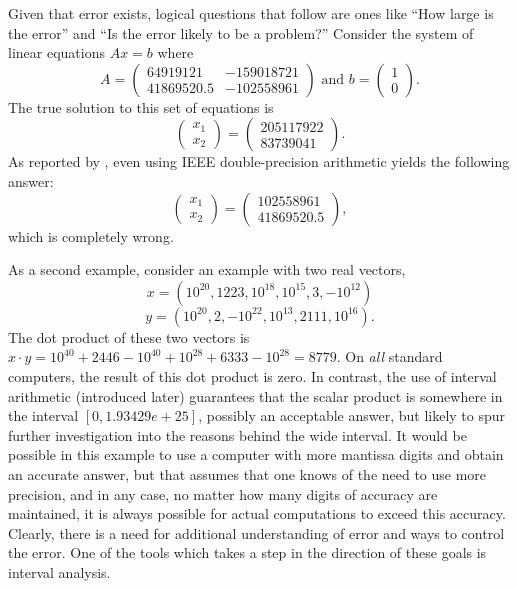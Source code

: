 Given that error exists, logical questions that follow are ones like ``How
large is the error'' and ``Is the error likely to be a problem?''
Consider the system of linear equations $Ax=b$ where
\begin{equation}
 A = \left( \begin{array}{ll}
  64919121 & -159018721 \\
  41869520.5 & -102558961
 \end{array}\right)
 \mbox{ and } b = \left( \begin{array}{l}1 \\ 0 \end{array}\right).
\end{equation}
The true solution to this set of equations is 
\begin{equation}
 \left( \begin{array}{l}
 x_1 \\
 x_2 \end{array} \right)
 = \left( \begin{array}{r}
 205117922\\
 83739041 \end{array}\right).
\end{equation}
As reported by \cite{Bohlender}, even using IEEE double-precision
arithmetic yields the following answer: 
\begin{equation}
 \left(\begin{array}{l}
 x_1 \\ x_2 \end{array}\right) 
 = \left( \begin{array}{r} 102558961 \\ 41869520.5 \end{array}\right),
\end{equation}
which is completely wrong.  

As a second example, \cite{Toolbox} consider an example with two real 
vectors, $$x=(10^{20}, 1223,10^{18}, 10^{15}, 3, -10^{12})$$
$$y=(10^{20}, 2, -10^{22}, 10^{13}, 2111,10^{16}).$$
The dot product of these two vectors is 
$x \cdot y = 10^{40} + 2446 -10^{40} +10^{28} +6333 - 10^{28} = 8779.$
On {\it all} standard computers, the result of this dot product is zero.
In contrast, the use of interval arithmetic (introduced later)
guarantees that the scalar product
is somewhere in the interval $[0,1.93429e+25]$, possibly an acceptable answer,
but likely to spur further investigation into the reasons behind the wide
interval.  It would be possible in this example to use a computer
with more mantissa digits and obtain an accurate answer, but that assumes that
one knows of the need to use more precision, and in any case, no matter how
many digits of accuracy are maintained, it is always possible for 
actual computations to exceed this accuracy.  Clearly, there is a need 
for additional understanding of error and ways to control the error.  One 
of the tools which takes a step in the direction of these goals is 
interval analysis.

